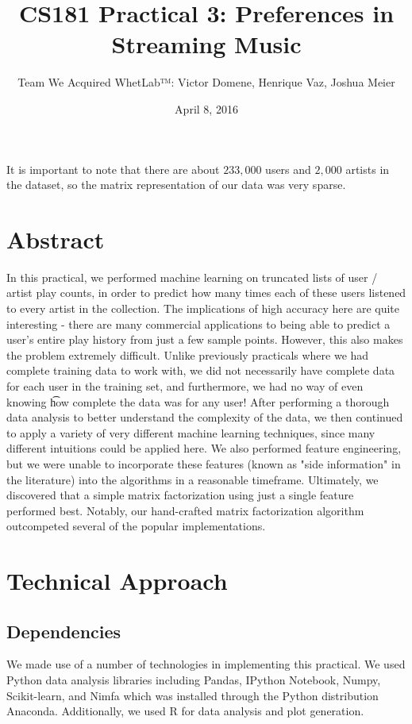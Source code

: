 \documentclass[10pt]{article}
\title{CS181 Practical 3: Preferences in Streaming Music}
\author{Team We Acquired WhetLab™: Victor Domene, Henrique Vaz, Joshua Meier }
\date{April 8, 2016}
\begin{document}
\maketitle

 It is important to note that there are about $233,000$ users and $2,000$ artists in the dataset, so the matrix representation of our data was very sparse. 


\section{Abstract}
In this practical, we performed machine learning on truncated lists of user / artist play counts, in order to predict how many times each of these users listened to every artist in the collection. The implications of high accuracy here are quite interesting - there are many commercial applications to being able to predict a user's entire play history from just a few sample points. However, this also makes the problem extremely difficult. Unlike previously practicals where we had complete training data to work with, we did not necessarily have complete data for each user in the training set, and furthermore, we had no way of even knowing {\t how} complete the data was for any user! After performing a thorough data analysis to better understand the complexity of the data, we then continued to apply a variety of very different machine learning techniques, since many different intuitions could be applied here. We also performed feature engineering, but we were unable to incorporate these features (known as "side information" in the literature) into the algorithms in a reasonable timeframe. Ultimately, we discovered that a simple matrix factorization using just a single feature performed best. Notably, our hand-crafted matrix factorization algorithm outcompeted several of the popular implementations. 

\section{Technical Approach}
\subsection{Dependencies}

We made use of a number of technologies in implementing this practical. We used Python data analysis libraries including Pandas, IPython Notebook, Numpy, Scikit-learn, and Nimfa which was installed through the Python distribution Anaconda. Additionally, we used R for data analysis and plot generation.
\end{document}
